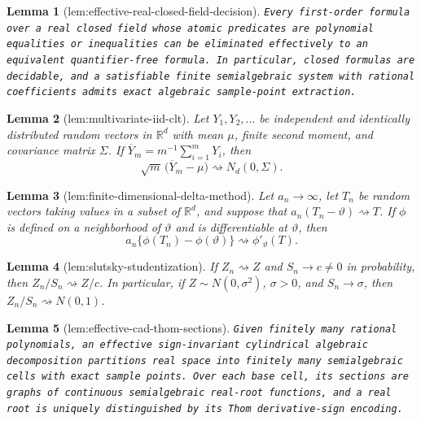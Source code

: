 \documentclass{article}
\newtheorem{lemma}{Lemma}
\begin{document}
\begin{lemma}[lem:effective-real-closed-field-decision]\label{lem:effective-real-closed-field-decision}
\texttt{Every first-\allowbreak{}order formula over a real closed field whose atomic predicates are polynomial equalities or inequalities can be eliminated effectively to an equivalent quantifier-\allowbreak{}free formula.  In particular,\allowbreak{} closed formulas are decidable,\allowbreak{} and a satisfiable finite semialgebraic system with rational coefficients admits exact algebraic sample-\allowbreak{}point extraction.}
\end{lemma}

\begin{lemma}[lem:multivariate-iid-clt]\label{lem:multivariate-iid-clt}
Let \(Y_1,Y_2,\ldots\) be independent and identically distributed random vectors in \(\mathbb R^d\) with mean \(\mu\), finite second moment, and covariance matrix \(\Sigma\). If \(\overline Y_m=m^{-1}\sum_{i=1}^mY_i\), then
\[
 \sqrt m\,\bigl(\overline Y_m-\mu\bigr)\rightsquigarrow N_d(0,\Sigma).
\]
\end{lemma}

\begin{lemma}[lem:finite-dimensional-delta-method]\label{lem:finite-dimensional-delta-method}
Let \(a_n\to\infty\), let \(T_n\) be random vectors taking values in a subset of \(\mathbb R^d\), and suppose that \(a_n(T_n-\vartheta)\rightsquigarrow T\). If \(\phi\) is defined on a neighborhood of \(\vartheta\) and is differentiable at \(\vartheta\), then
\[
 a_n\{\phi(T_n)-\phi(\vartheta)\}\rightsquigarrow \phi'_{\vartheta}(T).
\]
\end{lemma}

\begin{lemma}[lem:slutsky-studentization]\label{lem:slutsky-studentization}
If \(Z_n\rightsquigarrow Z\) and \(S_n\to c\ne0\) in probability, then \(Z_n/S_n\rightsquigarrow Z/c\). In particular, if \(Z\sim N(0,\sigma^2)\), \(\sigma>0\), and \(S_n\to\sigma\), then \(Z_n/S_n\rightsquigarrow N(0,1)\).
\end{lemma}

\begin{lemma}[lem:effective-cad-thom-sections]\label{lem:effective-cad-thom-sections}
\texttt{Given finitely many rational polynomials,\allowbreak{} an effective sign-\allowbreak{}invariant cylindrical algebraic decomposition partitions real space into finitely many semialgebraic cells with exact sample points.  Over each base cell,\allowbreak{} its sections are graphs of continuous semialgebraic real-\allowbreak{}root functions,\allowbreak{} and a real root is uniquely distinguished by its Thom derivative-\allowbreak{}sign encoding.}
\end{lemma}
\end{document}
